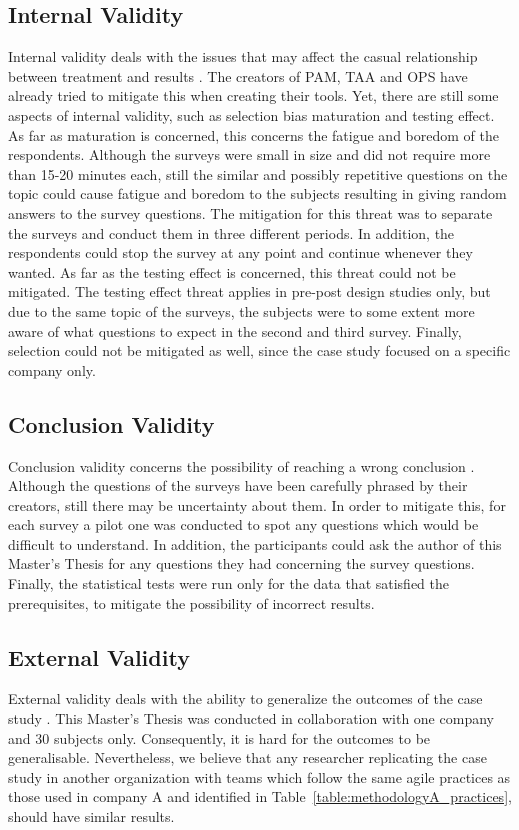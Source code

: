 \subsection{Internal Validity}
Internal validity deals with the issues that may affect the casual relationship between treatment and results \cite{Wohlin}. The creators of \ac{PAM}, \ac{TAA} and \ac{OPS} have already tried to mitigate this when creating their tools. Yet, there are still some aspects of internal validity, such as selection bias maturation and testing effect. As far as maturation is concerned, this concerns the fatigue and boredom of the respondents. Although the surveys were small in size and did not require more than 15-20 minutes each, still the similar and possibly repetitive questions on the topic could cause fatigue and boredom to the subjects resulting in giving random answers to the survey questions. The mitigation for this threat was to separate the surveys and conduct them in three different periods. In addition, the respondents could stop the survey at any point and continue whenever they wanted. As far as the testing effect is concerned, this threat could not be mitigated. The testing effect threat applies in pre-post design studies only, but due to the same topic of the surveys, the subjects were to some extent more aware of what questions to expect in the second and third survey. Finally, selection could not be mitigated as well, since the case study focused on a specific company only.

\subsection{Conclusion Validity}
Conclusion validity concerns the possibility of reaching a wrong conclusion \cite{Wohlin}. Although the questions of the surveys have been carefully phrased by their creators, still there may be uncertainty about them. In order to mitigate this, for each survey a pilot one was conducted to spot any questions which would be difficult to understand. In addition, the participants could ask the author of this Master's Thesis for any questions they had concerning the survey questions. Finally, the statistical tests were run only for the data that satisfied the prerequisites, to mitigate the possibility of incorrect results. %

\subsection{External Validity}
External validity deals with the ability to generalize the outcomes of the case study \cite{Wohlin}. This Master's Thesis was conducted in collaboration with one company and 30 subjects only. Consequently, it is hard for the outcomes to be generalisable. Nevertheless, we believe that any researcher replicating the case study in another organization with teams which follow the same agile practices as those used in company A and identified in Table~\ref{table:methodologyA_practices}, should have similar results.

